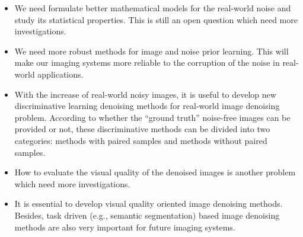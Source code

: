 \begin{itemize}
\item We need formulate better mathematical models for the real-world noise and study its statistical properties. This is still an open question which need more investigations.

\item We need more robust methods for image and noise prior learning. This will make our imaging systems more reliable to the corruption of the noise in real-world applications.

\item With the increase of real-world noisy images, it is useful to develop new discriminative learning denoising methods for real-world image denoising problem. According to whether the ``ground truth'' noise-free images can be provided or not, these discriminative methods can be divided into two categories: methods with paired samples and methods without paired samples. 

\item How to evaluate the visual quality of the denoised images is another problem which need more investigations.

\item It is essential to develop visual quality oriented image denoising methods. Besides, task driven (e.g., semantic segmentation) based image denoising methods are also very important for future imaging systems.

\end{itemize}
